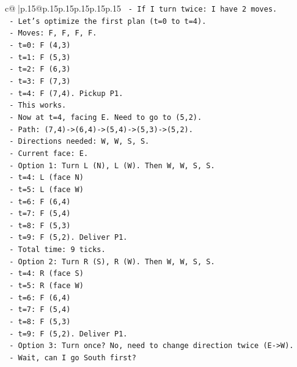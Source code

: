 \documentclass{article}
\begin{document}
{\begin{supertabular}{c@{$\;$}|p{.15\linewidth}@{}p{.15\linewidth}p{.15\linewidth}p{.15\linewidth}p{.15\linewidth}p{.15\linewidth}}
{{{\texttt{        {-} If I turn twice: I have 2 moves.} \\
\texttt{        {-} Let's optimize the first plan (t=0 to t=4).} \\
\texttt{        {-} Moves: F, F, F, F.} \\
\texttt{        {-} t=0: F (4,3)} \\
\texttt{        {-} t=1: F (5,3)} \\
\texttt{        {-} t=2: F (6,3)} \\
\texttt{        {-} t=3: F (7,3)} \\
\texttt{        {-} t=4: F (7,4). Pickup P1.} \\
\texttt{        {-} This works.} \\
\texttt{        {-} Now at t=4, facing E. Need to go to (5,2).} \\
\texttt{        {-} Path: (7,4){-}>(6,4){-}>(5,4){-}>(5,3){-}>(5,2).} \\
\texttt{        {-} Directions needed: W, W, S, S.} \\
\texttt{        {-} Current face: E.} \\
\texttt{        {-} Option 1: Turn L (N), L (W). Then W, W, S, S.} \\
\texttt{          {-} t=4: L (face N)} \\
\texttt{          {-} t=5: L (face W)} \\
\texttt{          {-} t=6: F (6,4)} \\
\texttt{          {-} t=7: F (5,4)} \\
\texttt{          {-} t=8: F (5,3)} \\
\texttt{          {-} t=9: F (5,2). Deliver P1.} \\
\texttt{          {-} Total time: 9 ticks.} \\
\texttt{        {-} Option 2: Turn R (S), R (W). Then W, W, S, S.} \\
\texttt{          {-} t=4: R (face S)} \\
\texttt{          {-} t=5: R (face W)} \\
\texttt{          {-} t=6: F (6,4)} \\
\texttt{          {-} t=7: F (5,4)} \\
\texttt{          {-} t=8: F (5,3)} \\
\texttt{          {-} t=9: F (5,2). Deliver P1.} \\
\texttt{        {-} Option 3: Turn once? No, need to change direction twice (E{-}>W).} \\
\texttt{        {-} Wait, can I go South first?} \\
}}}
\end{supertabular}}
\end{document}

